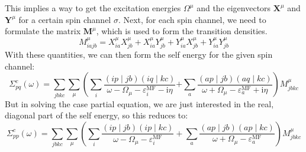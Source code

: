 \documentclass[12pt]{article}
\begin{document}
This implies a way to get the excitation energies $\Omega^\mu$ and the eigenvectors $\mathbf{X}^\mu$ and $\mathbf{Y}^\mu$ for a certain spin channel $\sigma $. Next, for each spin channel, we need to formulate the matrix $\mathbf{M}^{\mu }$, which is used to form the transition densities.
\begin{equation}
M_{i a j b}^{\mu }=X_{i a}^{\mu } X_{j b}^{\mu }+X_{i a}^{\mu } Y_{j b}^{\mu }+Y_{i a}^{\mu } X_{j b}^{\mu }+Y_{i a}^{\mu } Y_{j b}^{\mu }
\end{equation}
With these quantities, we can then form the self energy for the given spin channel:
\begin{equation}
\Sigma_{p q}^c\left(\omega \right)= \sum_{j b k c} \sum_{\mu }\left(\sum_i \frac{(i p \mid j b)(i q \mid k c)}{\omega -\Omega_{\mu }-\varepsilon_i^{\mathrm{MF}}-\mathrm{i} \eta}\right.
\left.+\sum_a \frac{(a p \mid j b)(a q \mid k c)}{\omega +\Omega_{\mu }-\varepsilon_a^{\mathrm{MF}}+\mathrm{i} \eta}\right) M_{j b k c}^{\mu }
\end{equation}
But in solving the case partial equation, we are just interested in the real, diagonal part of the self energy, so this reduces to:
\begin{equation}
\Sigma_{p p}^c\left(\omega \right)= \sum_{j b k c} \sum_{\mu }\left(\sum_i \frac{(i p \mid j b)(i p \mid k c)}{\omega -\Omega_{\mu }-\varepsilon_i^{\mathrm{MF}}} + \sum_a \frac{(a p \mid j b)(a p \mid k c)}{\omega +\Omega_{\mu }-\varepsilon_a^{\mathrm{MF}}}\right) M_{j b k c}^{\mu }
\end{equation}
\end{document}
